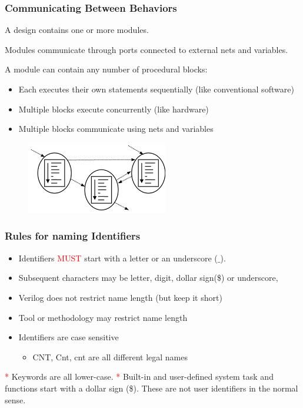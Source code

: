 \documentclass[t, notes]{beamer}
\begin{document}
\begin{frame}
\frametitle{Communicating Between Behaviors}

A design contains one or more modules.

Modules communicate through ports connected to external nets and variables.

A module can contain any number of procedural blocks:
\begin{itemize}
\item Each executes their own statements sequentially (like conventional software)
\item Multiple blocks execute concurrently (like hardware)
\item Multiple blocks communicate using nets and variables
\end{itemize}

\begin{figure}[H!]
    \includegraphics[width=0.55\textwidth]{img/03_proc.png}
\end{figure}

\end{frame}

\begin{frame}
\frametitle{Rules for naming Identifiers}

\begin{itemize}
\item Identifiers \textcolor{red}{MUST} start with a letter or an underscore ($\_$).
\item Subsequent characters may be letter, digit, dollar sign(\$) or underscore,
\item Verilog does not restrict name length (but keep it short)
\item Tool or methodology may restrict name length
\item Identifiers are case sensitive
\begin{itemize}
	\item CNT, Cnt, cnt are all different legal names
\end{itemize}
\end{itemize}
\vfill
\textcolor{red}{*} Keywords are all lower-case.
\newline
\textcolor{red}{*} Built-in and user-defined system task and functions start with a dollar sign (\$). These are not user identifiers in the normal sense.

\end{frame}
\end{document}
